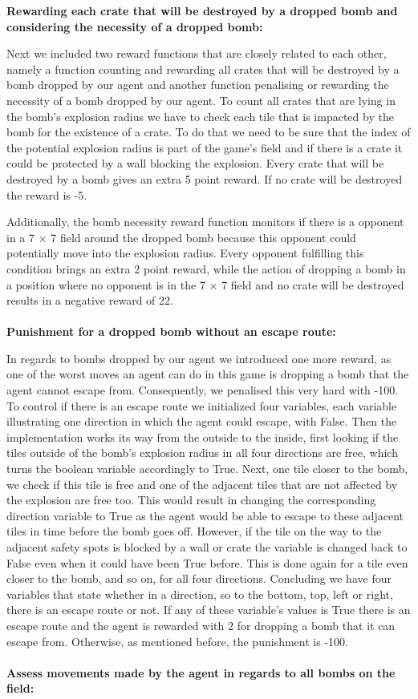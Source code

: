 \textbf{Rewarding each crate that will be destroyed by a dropped bomb and considering the necessity of a dropped bomb:}

Next we included two reward functions that are closely related to each other, namely a function counting and rewarding all crates that will be destroyed by a bomb dropped by our agent and another function penalising or rewarding the necessity of a bomb dropped by our agent. To count all crates that are lying in the bomb's explosion radius we have to check each tile that is impacted by the bomb for the existence of a crate. To do that we need to be sure that the index of the potential explosion radius is part of the game's field and if there is a crate it could be protected by a wall blocking the explosion. Every crate that will be destroyed by a bomb gives an extra 5 point reward. If no crate will be destroyed the reward is -5. 

Additionally, the bomb necessity reward function monitors if there is a opponent in a 7 $\times$ 7 field around the dropped bomb because this opponent could potentially move into the explosion radius. Every opponent fulfilling this condition brings an extra 2 point reward, while the action of dropping a bomb in a position where no opponent is in the 7 $\times$ 7 field and no crate will be destroyed results in a negative reward of 22.
\\ \\
\textbf{Punishment for a dropped bomb without an escape route:}

In regards to bombs dropped by our agent we introduced one more reward, as one of the worst moves an agent can do in this game is dropping a bomb that the agent cannot escape from. Consequently, we penalised this very hard with -100. To control if there is an escape route we initialized four variables, each variable illustrating one direction in which the agent could escape, with False. Then the implementation works its way from the outside to the inside, first looking if the tiles outside of the bomb's explosion radius in all four directions are free, which turns the boolean variable accordingly to True. Next, one tile closer to the bomb, we check if this tile is free and one of the adjacent tiles that are not affected by the explosion are free too. This would result in changing the corresponding direction variable to True as the agent would be able to escape to these adjacent tiles in time before the bomb goes off. However, if the tile on the way to the adjacent safety spots is blocked by a wall or crate the variable is changed back to False even when it could have been True before. This is done again for a tile even closer to the bomb, and so on, for all four directions. Concluding we have four variables that state whether in a direction, so to the bottom, top, left or right, there is an escape route or not. If any of these variable's values is True there is an escape route and the agent is rewarded with 2 for dropping a bomb that it can escape from. Otherwise, as mentioned before, the punishment is -100.
\\ \\
\textbf{Assess movements made by the agent in regards to all bombs on the field:}

